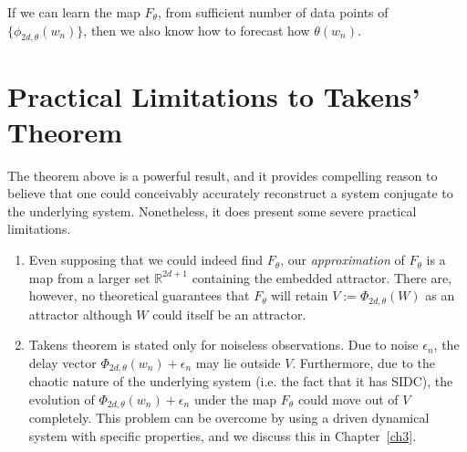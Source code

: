 If we can learn the map $F_\theta$, from sufficient number of data points of $\{\phi_{2d,\theta}(w_n)\}$, then we also know how to forecast how $\theta(w_n)$. 




\section{Practical Limitations to Takens' Theorem}\label{sect_takenslimits}
The theorem above is a powerful result, and it provides compelling reason to believe that one could conceivably accurately reconstruct a system conjugate to the underlying system. 
Nonetheless, it does present some severe practical limitations.
\vspace{-5mm}
\begin{enumerate}
\item Even supposing that we could indeed find $F_\theta$, our \emph{approximation} of  $F_\theta$ is a map from a larger set $\mathbb{R}^{2d+1}$ containing the embedded attractor. There are, however, no theoretical guarantees that $F_\theta$ will retain  $V:=\Phi_{2d,\theta}(W)$  as an attractor although $W$ could itself be an attractor.
\item Takens theorem is stated only for noiseless observations. Due to noise $\epsilon_n$, the delay vector $\Phi_{2d,\theta}(w_n) + \epsilon_n$  may lie outside $V$. Furthermore, due to the chaotic nature of the underlying system (i.e. the fact that it has SIDC), the evolution of $\Phi_{2d,\theta}(w_n) + \epsilon_n$ under the map $F_\theta$ could move out of $V$ completely. This problem can be overcome  by using a driven dynamical system with specific properties, and we discuss this in Chapter~\ref{ch3}. 
\end{enumerate}

